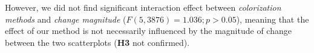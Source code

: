 {%


However, we did not find significant interaction effect between \emph{colorization methods} and \emph{change magnitude} ($F(5, 3876) = 1.036; p>0.05$), meaning that the effect of our method is not necessarily influenced by the magnitude of change between the two scatterplots (\textbf{H3} not confirmed).


}
